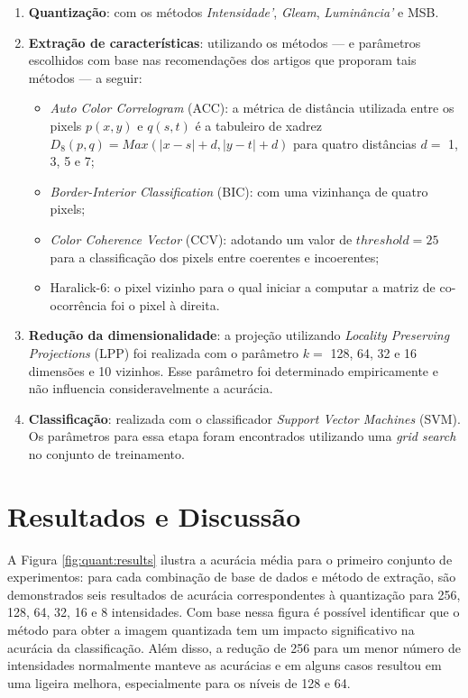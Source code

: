 \begin{enumerate}
\item \textbf{Quantização}: com os métodos \emph{Intensidade'}, \emph{Gleam}, \emph{Luminância'} e MSB.
\item \textbf{Extração de características}: utilizando os métodos --- e parâmetros escolhidos com base nas recomendações dos artigos que proporam tais métodos --- a seguir:
  \begin{itemize}
    \item \textit{Auto Color Correlogram} (ACC): a métrica de distância utilizada entre os pixels $p(x,y)$ e $q(s,t)$ é a tabuleiro de xadrez $D_8(p,q) = Max(|x-s| + d, |y-t| + d)$ para quatro distâncias $d =$ 1, 3, 5 e 7;
    \item \textit{Border-Interior Classification} (BIC): com uma vizinhança de quatro pixels;
    \item \textit{Color Coherence Vector} (CCV): adotando um valor de $\mathit{threshold} = 25$ para a classificação dos pixels entre coerentes e incoerentes;
    \item Haralick-6: o pixel vizinho para o qual iniciar a computar a matriz de co-ocorrência foi o pixel à direita.
  \end{itemize}
\item \textbf{Redução da dimensionalidade}: a projeção utilizando \textit{Locality Preserving Projections} (LPP) foi realizada com o parâmetro $k =$ 128, 64, 32 e 16 dimensões e 10 vizinhos. Esse parâmetro foi determinado empiricamente e não influencia consideravelmente a acurácia.
\item \textbf{Classificação}: realizada com o classificador \textit{Support Vector Machines} (SVM). Os parâmetros para essa etapa foram encontrados utilizando uma \textit{grid search} no conjunto de treinamento.
\end{enumerate}

\section{Resultados e Discussão}

A Figura \ref{fig:quant:results} ilustra a acurácia média para o primeiro conjunto de experimentos: para cada combinação de base de dados e método de extração, são demonstrados seis resultados de acurácia correspondentes à quantização para 256, 128, 64, 32, 16 e 8 intensidades. Com base nessa figura é possível identificar que o método para obter a imagem quantizada tem um impacto significativo na acurácia da classificação. Além disso, a redução de 256 para um menor número de intensidades normalmente manteve as acurácias e em alguns casos resultou em uma ligeira melhora, especialmente para os níveis de 128 e 64.

